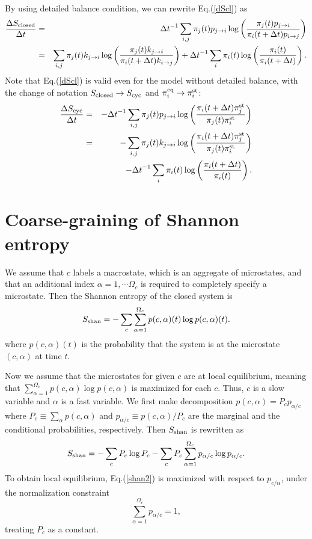 \documentclass[aps,pre,amsmath,amssymb,floatfix,preprint,nofootinbib]{revtex4}
\begin{document}
By using detailed balance condition, we can rewrite Eq.(\ref{dScl}) as
\begin{eqnarray}
\frac{\Delta S_{\rm closed}}{\Delta t} &=& {\Delta t}^{-1} \sum_{i,j} \pi_j(t) p_{j \to i}   \log \left(\frac{\pi_j(t) p_{j \to i}}{\pi_i(t +\Delta t) p_{i \to j}}\right) \nonumber\\
&=& \sum_{i,j} \pi_j(t) k_{j \to i}   \log \left(\frac{\pi_j(t) k_{j \to i}}{\pi_i(t +\Delta t) k_{i \to j}}\right) + {\Delta t}^{-1} \sum_{i} \pi_i(t)  \log \left(\frac{\pi_i(t) }{\pi_i(t +\Delta t) }\right)
.
\end{eqnarray}
Note that Eq.(\ref{dScl}) is valid even for the model without detailed balance, with the change of notation $S_{\rm closed} \to S_{\rm cyc}$  and $\pi^{\rm eq}_i \to \pi^{\rm st}_i $:
\begin{eqnarray}
\frac{\Delta S_{\rm cyc}}{\Delta t} &=& -{\Delta t}^{-1} \sum_{i,j} \pi_j(t) p_{j \to i}   \log \left(\frac{\pi_i(t +\Delta t) \pi^{\rm st}_j}{\pi_j(t) \pi^{\rm st}_i}\right)\nonumber\\
&=& - \sum_{i,j} \pi_j(t) k_{j \to i}   \log \left(\frac{\pi_i(t +\Delta t) \pi^{\rm st}_j}{\pi_j(t) \pi^{\rm st}_i}\right) \nonumber\\
&& -{\Delta t}^{-1} \sum_{i} \pi_i(t)  \log \left(\frac{\pi_i(t +\Delta t) }{\pi_i(t) }\right). \label{dScy}
\end{eqnarray}

\section{Coarse-graining of Shannon entropy}\label{shanlee}
We assume that $c$ labels a macrostate, which is an aggregate of microstates, and that an additional index $\alpha=1,\cdots \Omega_c$ is required to completely specify a microstate. Then the Shannon entropy of the closed system is
\begin{equation}
S_{\rm shan} = - \sum_c \sum_{\alpha=1}^{\Omega_c} p(c,\alpha)(t) \log p(c,\alpha)(t). \label{shanshan}
\end{equation}
where $p(c,\alpha)(t)$ is the probability that the system is at the microstate $(c,\alpha)$ at time $t$. 

Now we assume that the microstates for given $c$ are at local equilibrium, meaning that $\sum_{\alpha=1}^{\Omega_c} p(c,\alpha) \log p(c,\alpha)$ is maximized for each $c$. Thus, $c$ is a slow variable and $\alpha$ is a fast variable. We first make decomposition $p(c,\alpha) = P_c p_{\alpha/c}$ where $P_c \equiv \sum_\alpha p(c,\alpha)$ and $p_{\alpha/c} \equiv  p(c,\alpha)/P_c$ are the marginal and the conditional probabilities, respectively. Then $S_{\rm shan}$ is rewritten as~\cite{lee}
\begin{equation}
S_{\rm shan} = - \sum_{c} P_c \log P_c - \sum_c P_c \sum_{\alpha=1}^{\Omega_c }p_{\alpha/c} \log p_{\alpha/c}. \label{shan2}
\end{equation}
To obtain local equilibrium, Eq.(\ref{shan2}) is maximized with respect to $p_{c/\alpha}$,  under the normalization constraint
\begin{equation}
\sum_{\alpha=1}^{\Omega_c} p_{\alpha/c} = 1, \label{norm2}
\end{equation}
treating $P_c$ as a constant.
\end{document}
